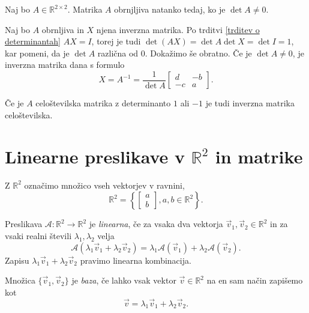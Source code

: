 \documentclass[GmVic, tisk]{gv}
\newcommand{\R}{\mathbb R}
\begin{document}
\begin{trditev} Naj bo $A \in \R^{2\times 2}$. Matrika $A$ obrnjljiva natanko tedaj, ko je  $\det A \ne  0$.
\end{trditev}

\begin{dokaz} Naj bo $A$ obrnljiva in $X$ njena inverzna matrika. Po trditvi \ref{trditev o determinantah} $AX=I$, torej je tudi $\det (AX)= \det A \det X =\det I= 1$, kar pomeni, da je $\det A$ različna od $0.$ Dokažimo še obratno. Če je $\det A \ne  0$, je inverzna matrika dana s formulo 
$$X=A^{-1}=\frac{1}{\det A} 
     \begin{bmatrix}
         d&-b\\
         -c&a
      \end{bmatrix}.
$$
\end{dokaz}

\begin{opomba} Če je $A$ celoštevilska matrika z determinanto $1$ ali $-1$ je tudi inverzna matrika celoštevilska.
\end{opomba}

\section{Linearne preslikave v $\R^2$ in matrike}

\begin{definicija}Z $\R^2$ označimo množico vseh vektorjev v ravnini, 
\[
\R^2=\left\{ \begin{bmatrix}
         a\\
         b
      \end{bmatrix}, a,b \in \R^2\right\}.
\]
\end{definicija}

\begin{definicija}
Preslikava $\mathcal{A}: \R^2\rightarrow\R^2$ je {\em linearna}, če za vsaka dva vektorja $\vec{v}_1, \vec{v}_2 \in \R^2$ in za vsaki realni števili $\lambda_1, \lambda_2$ velja 
\[
\mathcal{A}(\lambda_1\vec{v}_1+\lambda_2 \vec{v}_2)=\lambda_1\mathcal{A}(\vec{v}_1)+\lambda_2\mathcal{A}(\vec{v}_2).
\]
Zapisu $\lambda_1\vec{v}_1+\lambda_2 \vec{v}_2$ pravimo {linearna kombinacija}.
\end{definicija}

\begin{definicija} Množica $\{\vec{v}_1, \vec{v}_2 \}$ je {\em baza}, če lahko vsak vektor $\vec{v} \in \R^2$ na en sam način zapišemo kot \[
\vec{v}=\lambda_1\vec{v}_1+\lambda_2 \vec{v}_2.
\]
\end {definicija}
\end{document}
